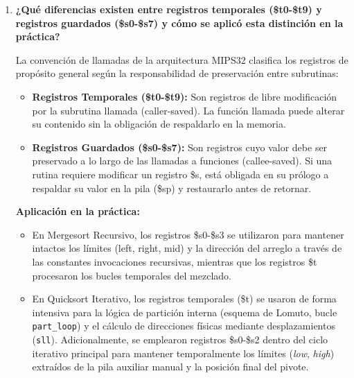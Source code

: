 \documentclass[12pt,letterpaper]{article}
\begin{document}
\newpage %


\begin{enumerate}

    \item \textbf{\large\color{UCBlue}¿Qué diferencias existen entre registros temporales (\$t0-\$t9) y registros guardados (\$s0-\$s7) y cómo se aplicó esta distinción en la práctica?}
    
    \vspace{0.2cm}
    La convención de llamadas de la arquitectura MIPS32 clasifica los registros de propósito general según la responsabilidad de preservación entre subrutinas:
    \begin{itemize}
        \item \textbf{Registros Temporales (\$t0-\$t9):} Son registros de libre modificación por la subrutina llamada (caller-saved). La función llamada puede alterar su contenido sin la obligación de respaldarlo en la memoria.
        \item \textbf{Registros Guardados (\$s0-\$s7):} Son registros cuyo valor debe ser preservado a lo largo de las llamadas a funciones (callee-saved). Si una rutina requiere modificar un registro \$s, está obligada en su prólogo a respaldar su valor en la pila (\$sp) y restaurarlo antes de retornar.
    \end{itemize}
    
    \textbf{\color{UCSky}\sffamily Aplicación en la práctica:}
    \begin{itemize}
        \item En Mergesort Recursivo, los registros \$s0-\$s3 se utilizaron para mantener intactos los límites (left, right, mid) y la dirección del arreglo a través de las constantes invocaciones recursivas, mientras que los registros \$t procesaron los bucles temporales del mezclado.
        \item En Quicksort Iterativo, los registros temporales (\$t) se usaron de forma intensiva para la lógica de partición interna (esquema de Lomuto, bucle \texttt{part\_loop}) y el cálculo de direcciones físicas mediante desplazamientos (\texttt{sll}). Adicionalmente, se emplearon registros \$s0-\$s2 dentro del ciclo iterativo principal para mantener temporalmente los límites (\textit{low}, \textit{high}) extraídos de la pila auxiliar manual y la posición final del pivote.
    \end{itemize}


\end{enumerate}
\end{document}
